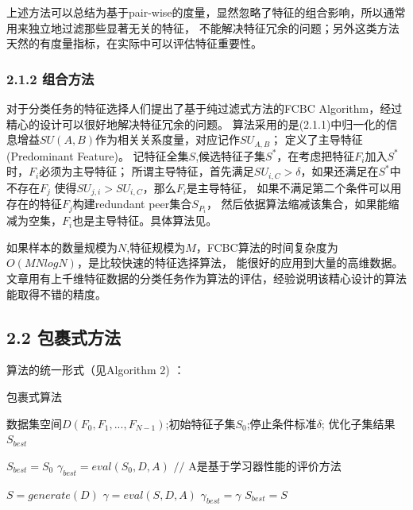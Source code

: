\documentclass[a4paper,UTF8]{article}
\begin{document}
  上述方法可以总结为基于pair-wise的度量，显然忽略了特征的组合影响，所以通常用来独立地过滤那些显著无关的特征，
  不能解决特征冗余的问题；另外这类方法天然的有度量指标，在实际中可以评估特征重要性。


\subsubsection*{2.1.2 组合方法}

对于分类任务的特征选择人们提出了基于纯过滤式方法的FCBC Algorithm，经过精心的设计可以很好地解决特征冗余的问题。
算法采用的是(2.1.1)中归一化的信息增益$SU(A,B)$作为相关关系度量，对应记作$SU_{A,B}$；
定义了主导特征(Predominant Feature)。
记特征全集$S$,候选特征子集$S^{*}$，在考虑把特征$F_{i}$加入$S^{*}$时，$F_{i}$必须为主导特征；
所谓主导特征，首先满足$SU_{i,C} > \delta$，如果还满足在$S^{*}$中不存在$F_{j}$
使得$SU_{j,i}>SU_{i,C}$，那么$F_{i}$是主导特征，
如果不满足第二个条件可以用存在的特征$F_{j}$构建redundant peer集合$S_{P_{i}}$，
然后依据算法缩减该集合，如果能缩减为空集，$F_{i}$也是主导特征。具体算法见\cite{DBLP:conf/icml/YuL03}。

如果样本的数量规模为$N$,特征规模为$M$，FCBC算法的时间复杂度为$O(MNlogN)$，是比较快速的特征选择算法，
能很好的应用到大量的高维数据。文章用有上千维特征数据的分类任务作为算法的评估，经验说明该精心设计的算法能取得不错的精度。


\subsection*{2.2 包裹式方法}
算法的统一形式（见Algorithm 2)
\cite{DBLP:journals/tkde/LiuY05}：
\begin{algorithm}
  \caption{包裹式算法}
  \begin{algorithmic}[1]
    \REQUIRE 数据集空间$D(F_{0}, F_{1},..., F_{N-1})$;初始特征子集$S_{0}$;停止条件标准$\delta$;
    \ENSURE 优化子集结果$S_{best}$

    \STATE $S_{best}=S_{0}$
    \STATE $\gamma_{best}=eval(S_{0},D,A)$          $//$ A是基于学习器性能的评价方法

      \STATE $S=generate(D)$
      \STATE $\gamma=eval(S,D,A)$
          \STATE $\gamma_{best}=\gamma$
          \STATE $S_{best}=S$
        \ENDIF
    \ENDWHILE


  \end{algorithmic}
\end{algorithm}
\end{document}
